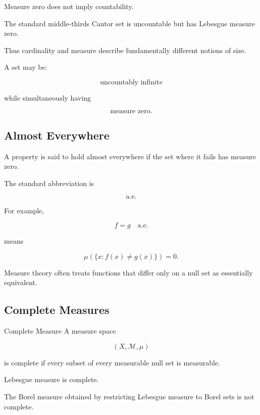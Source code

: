 Measure zero does not imply countability.

The standard middle-thirds Cantor set is uncountable but has Lebesgue
measure zero.

Thus cardinality and measure describe fundamentally different notions of
size.

A set may be:

\[
\boxed{
\text{uncountably infinite}
}
\]

while simultaneously having

\[
\boxed{
\text{measure zero}.
}
\]

\subsection{Almost Everywhere}
\label{subsec:almost-everywhere}

A property is said to hold almost everywhere if the set where it fails has
measure zero.

The standard abbreviation is

\[
\boxed{
\text{a.e.}
}
\]

For example,

\[
f=g
\quad
\text{a.e.}
\]

means

\[
\boxed{
\mu(
\{x:f(x)\neq g(x)\}
)
=
0.
}
\]

Measure theory often treats functions that differ only on a null set as
essentially equivalent.

\subsection{Complete Measures}
\label{subsec:complete-measures}

\begin{definitionbox}{Complete Measure}
A measure space

\[
(X,\mathcal{M},\mu)
\]

is complete if every subset of every measurable null set is measurable.
\end{definitionbox}

Lebesgue measure is complete.

The Borel measure obtained by restricting Lebesgue measure to Borel sets is
not complete.


